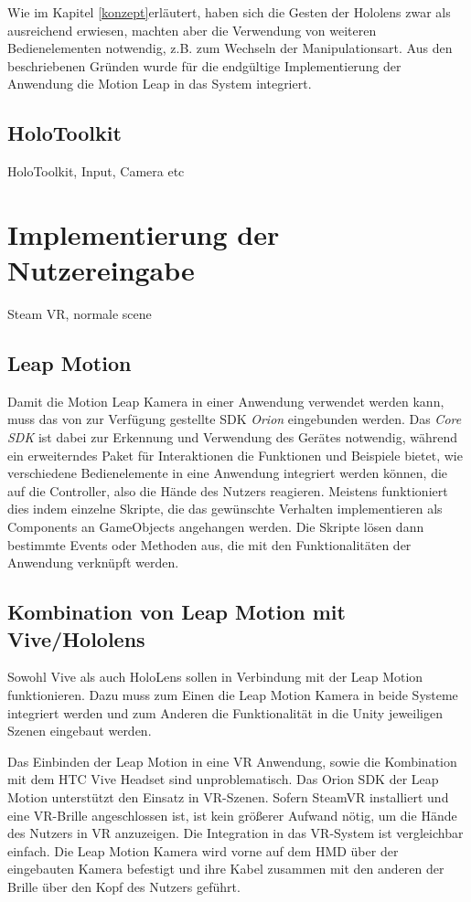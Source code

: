 Wie im Kapitel \ref{konzept}erläutert, haben sich die Gesten der Hololens zwar als ausreichend erwiesen, machten aber die Verwendung von weiteren Bedienelementen notwendig, z.B. zum Wechseln der Manipulationsart. Aus den beschriebenen Gründen wurde für die endgültige Implementierung der Anwendung die Motion Leap in das System integriert.


\subsection{HoloToolkit}

HoloToolkit, Input, Camera etc
\section{Implementierung der Nutzereingabe}
Steam VR, normale scene

\subsection{Leap Motion}

Damit die Motion Leap Kamera in einer Anwendung verwendet werden kann, muss das von \cite{orion} zur Verfügung gestellte SDK \textit{Orion} eingebunden werden. Das \textit{Core SDK} ist dabei zur Erkennung und Verwendung des Gerätes notwendig, während ein erweiterndes Paket für Interaktionen die Funktionen und Beispiele bietet, wie verschiedene Bedienelemente in eine Anwendung integriert werden können, die auf die Controller, also die Hände des Nutzers reagieren.
Meistens funktioniert dies indem einzelne Skripte, die das gewünschte Verhalten implementieren als Components an GameObjects angehangen werden. Die Skripte lösen dann bestimmte Events oder Methoden aus, die mit den Funktionalitäten der Anwendung verknüpft werden. 

\subsection{Kombination von Leap Motion mit Vive/Hololens}
\label{kombination}

Sowohl Vive als auch HoloLens sollen in Verbindung mit der Leap Motion funktionieren. Dazu muss zum Einen die Leap Motion Kamera in beide Systeme integriert werden und zum Anderen die Funktionalität in die Unity jeweiligen Szenen eingebaut werden. 

Das Einbinden der Leap Motion in eine VR Anwendung, sowie die Kombination mit dem HTC Vive Headset sind unproblematisch. Das Orion SDK der Leap Motion unterstützt den Einsatz in VR-Szenen. Sofern SteamVR installiert und eine VR-Brille angeschlossen ist, ist kein größerer Aufwand nötig, um die Hände des Nutzers in VR anzuzeigen. 
Die Integration in das VR-System ist vergleichbar einfach. Die Leap Motion Kamera wird vorne auf dem HMD über der eingebauten Kamera befestigt und ihre Kabel zusammen mit den anderen der Brille über den Kopf des Nutzers geführt. 

